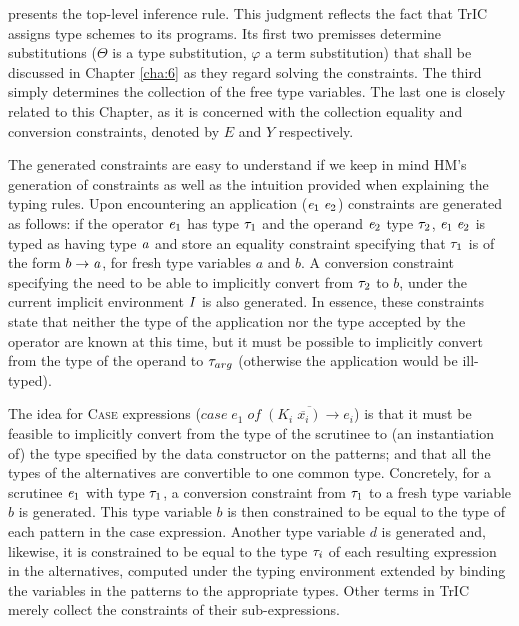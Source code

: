  presents the top-level inference rule. This judgment reflects the fact that TrIC assigns type schemes to its programs. Its first two premisses determine substitutions ($\Theta$ is a type substitution, $\varphi$ a term substitution) that shall be discussed in Chapter \ref{cha:6} as they regard solving the constraints. The third simply determines the collection of the free type variables. The last one is closely related to this Chapter, as it is concerned with the collection equality and conversion constraints, denoted by $E$ and $Y$ respectively.

The generated constraints are easy to understand if we keep in mind HM's generation of constraints as well as the intuition provided when explaining the typing rules. Upon encountering an application ($\mathit{e}_1\;\mathit{e}_2$) constraints are generated as follows: if the operator $\mathit{e}_1$ has type $\mathit{\tau}_1$ and the operand $\mathit{e}_2$ type $\mathit{\tau}_2$, $\mathit{e}_1\;\mathit{e}_2$ is typed as having type $\mathit{a}$ and store an equality constraint specifying that $\mathit{\tau}_1$ is of the form $b \to \mathit{a}$, for fresh type variables $a$ and $b$. A conversion constraint specifying the need to be able to implicitly convert from $\mathit{\tau}_2$ to $b$, under the current implicit environment $I$ is also generated. In essence, these constraints state that neither the type of the application nor the type accepted by the operator are known at this time, but it must be possible to implicitly convert from the type of the operand to $\mathit{\tau}_{arg}$ (otherwise the application would be ill-typed).

The idea for \textsc{Case} expressions ($case\;e_1\;of\;\overline{(K_i\;\overline{x_i})\rightarrow e_i}$) is that it must be feasible to implicitly convert from the type of the scrutinee to (an instantiation of) the type specified by the data constructor on the patterns; and that all the types of the alternatives are convertible to one common type. Concretely, for a scrutinee  $\mathit{e}_1$ with type $\mathit{\tau}_1$, a conversion constraint from $\mathit{\tau}_1$ to a fresh type variable $b$ is generated. This type variable $b$ is then constrained to be equal to the type of each pattern in the case expression. Another type variable $d$ is generated and, likewise, it is constrained to be equal to the type $\mathit{\tau}_i$ of each resulting expression in the alternatives, computed under the typing environment extended by binding the variables in the patterns to the appropriate types. Other terms in TrIC merely collect the constraints of their sub-expressions.

